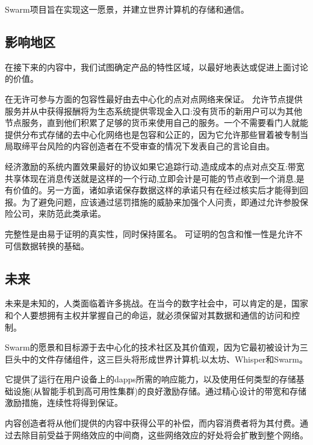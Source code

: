 Swarm项目旨在实现这一愿景，并建立世界计算机的存储和通信。 

\subsection{影响地区\statusorange}

在接下来的内容中，我们试图确定产品的特性区域，以最好地表达或促进上面讨论的价值。

在无许可参与方面的包容性最好由去中心化的点对点网络来保证。
允许节点提供服务并从中获得报酬将为生态系统提供零现金入口:没有货币的新用户可以为其他节点服务，直到他们积累了足够的货币来使用自己的服务。一个不需要看门人就能提供分布式存储的去中心化网络也是包容和公正的，因为它允许那些冒着被专制当局取缔平台风险的内容创造者在不受审查的情况下发表自己的言论自由。

经济激励的系统内置效果最好的协议如果它追踪行动,造成成本的点对点交互:带宽共享体现在消息传送就是这样的一个行动,立即会计是可能的节点收到一个消息,是有价值的。另一方面，诸如承诺保存数据这样的承诺只有在经过核实后才能得到回报。为了避免问题，应该通过惩罚措施的威胁来加强个人问责，即通过允许参股保险公司，来防范此类承诺。

完整性是由易于证明的真实性，同时保持匿名。
可证明的包含和惟一性是允许不可信数据转换的基础。


\subsection{未来} \label{sec:future}

未来是未知的，人类面临着许多挑战。在当今的数字社会中，可以肯定的是，国家和个人要想拥有主权并掌握自己的命运，就必须保留对其数据和通信的访问和控制。

Swarm的愿景和目标源于去中心化的技术社区及其价值观，因为它最初被设计为三巨头中的文件存储组件，这三巨头将形成世界计算机:以太坊、Whisper和Swarm。

它提供了运行在用户设备上的dapps所需的响应能力，以及使用任何类型的存储基础设施(从智能手机到高可用性集群)的良好激励存储。通过精心设计的带宽和存储激励措施，连续性将得到保证。

内容创造者将从他们提供的内容中获得公平的补偿，而内容消费者将为其付费。通过去除目前受益于网络效应的中间商，这些网络效应的好处将会扩散到整个网络。

